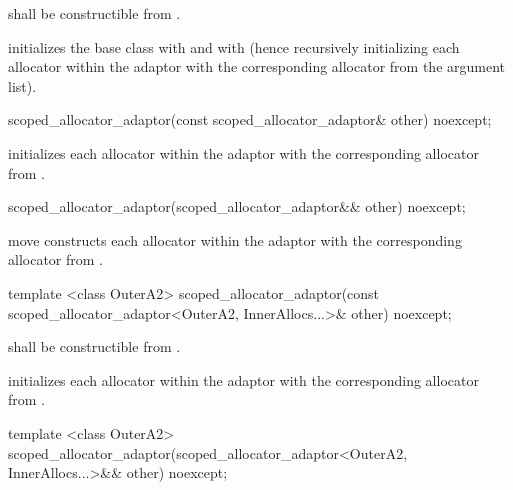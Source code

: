 \begin{itemdescr}
\pnum
\requires {} shall be constructible from .

\pnum
\effects initializes the  base class with
 and  with 
(hence recursively initializing each allocator within the adaptor with the corresponding
allocator from the argument list).
\end{itemdescr}

%
\begin{itemdecl}
scoped_allocator_adaptor(const scoped_allocator_adaptor& other) noexcept;
\end{itemdecl}

\begin{itemdescr}
\pnum
\effects initializes each allocator within the adaptor with the corresponding allocator
from .
\end{itemdescr}

%
\begin{itemdecl}
scoped_allocator_adaptor(scoped_allocator_adaptor&& other) noexcept;
\end{itemdecl}

\begin{itemdescr}
\pnum
\effects move constructs each allocator within the adaptor with the corresponding allocator
from .
\end{itemdescr}

%
\begin{itemdecl}
template <class OuterA2>
  scoped_allocator_adaptor(const scoped_allocator_adaptor<OuterA2,
                                                          InnerAllocs...>& other) noexcept;
\end{itemdecl}

\begin{itemdescr}
\pnum
\requires {} shall be constructible from .

\pnum
\effects initializes each allocator within the adaptor with the corresponding allocator
from .
\end{itemdescr}

%
\begin{itemdecl}
template <class OuterA2>
  scoped_allocator_adaptor(scoped_allocator_adaptor<OuterA2,
                                                    InnerAllocs...>&& other) noexcept;
\end{itemdecl}

